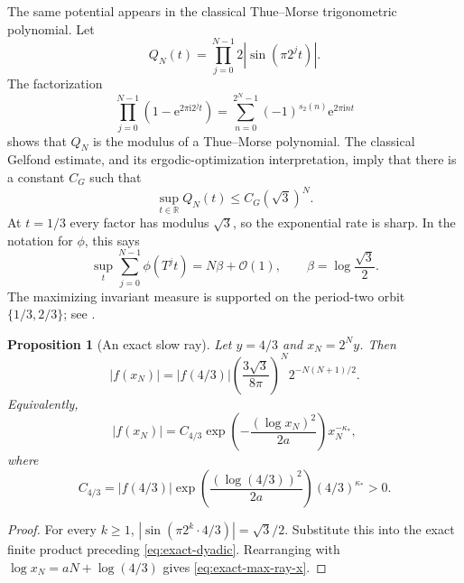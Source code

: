 \documentclass[11pt,oneside]{article}
\newtheorem{proposition}[theorem]{Proposition}
\theoremstyle{definition}
\theoremstyle{remark}
\newcommand{\R}{\mathbb R}
\newcommand{\e}{\mathrm e}
\newcommand{\ii}{\mathrm i}
\newcommand{\bigO}{\mathcal O}
\newcommand{\wt}{s_2}
\newcommand{\T}{T}
\begin{document}
The same potential appears in the classical Thue--Morse trigonometric
polynomial.  Let
\begin{equation}
 Q_N(t)=\prod_{j=0}^{N-1}2|\sin(\pi2^jt)|.
 \label{eq:QN-product}
\end{equation}
The factorization
\begin{equation}
 \prod_{j=0}^{N-1}(1-\e^{2\pi\ii2^jt})
 =\sum_{n=0}^{2^N-1}(-1)^{\wt(n)}\e^{2\pi\ii nt}           \label{eq:tm-poly}
\end{equation}
shows that $Q_N$ is the modulus of a Thue--Morse polynomial.  The classical
Gelfond estimate, and its ergodic-optimization interpretation, imply that
there is a constant $C_G$ such that
\begin{equation}
 \sup_{t\in\R}Q_N(t)\le C_G(\sqrt3)^N.                     \label{eq:gelfond}
\end{equation}
At $t=1/3$ every factor has modulus $\sqrt3$, so the exponential rate is
sharp.  In the notation for $\phi$, this says
\begin{equation}
 \sup_t\sum_{j=0}^{N-1}\phi(\T^jt)=N\beta+\bigO(1),
 \qquad \beta=\log\frac{\sqrt3}{2}.                        \label{eq:max-birkhoff}
\end{equation}
The maximizing invariant measure is supported on the period-two orbit
$\{1/3,2/3\}$; see \cite{gelfond1968,fan2021,zhang2018}.

\begin{proposition}[An exact slow ray]
Let $y=4/3$ and $x_N=2^Ny$.  Then
\begin{equation}
 |f(x_N)|
 =|f(4/3)|
 \left(\frac{3\sqrt3}{8\pi}\right)^N
 2^{-N(N+1)/2}.                                             \label{eq:exact-max-ray}
\end{equation}
Equivalently,
\begin{equation}
 |f(x_N)|=C_{4/3}
 \exp\!\left(-\frac{(\log x_N)^2}{2a}\right)x_N^{-\kappa_*},
 \label{eq:exact-max-ray-x}
\end{equation}
where
\begin{equation}
 C_{4/3}=|f(4/3)|
 \exp\!\left(\frac{(\log(4/3))^2}{2a}\right)(4/3)^{\kappa_*}>0.
\end{equation}
\end{proposition}

\begin{proof}
For every $k\ge1$,
$|\sin(\pi2^k\cdot4/3)|=\sqrt3/2$.  Substitute this into the exact finite
product preceding \eqref{eq:exact-dyadic}.  Rearranging with
$\log x_N=aN+\log(4/3)$ gives \eqref{eq:exact-max-ray-x}.
\end{proof}
\end{document}

